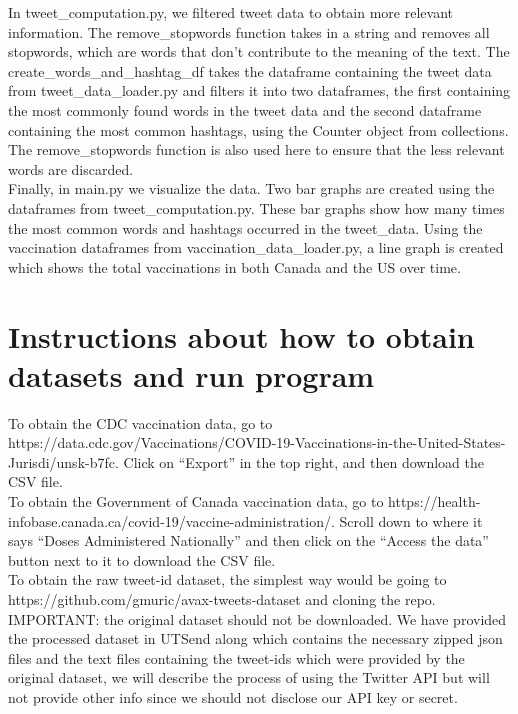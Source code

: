 \documentclass[fontsize=11pt]{article}
\begin{document}
In tweet\_computation.py, we filtered tweet data to obtain more relevant information. The remove\_stopwords function takes in a string and removes all stopwords, which are words that don’t contribute to the meaning of the text. The create\_words\_and\_hashtag\_df takes the dataframe containing the tweet data from tweet\_data\_loader.py and filters it into two dataframes, the first containing the most commonly found words in the tweet data and the second dataframe containing the most common hashtags, using the Counter object from collections. The remove\_stopwords function is also used here to ensure that the less relevant words are discarded.\\

Finally, in main.py we visualize the data. Two bar graphs are created using the dataframes from tweet\_computation.py. These bar graphs show how many times the most common words and hashtags occurred in the tweet\_data. Using the vaccination dataframes from vaccination\_data\_loader.py, a line graph is created which shows the total vaccinations in both Canada and the US over time.

\section*{Instructions about how to obtain datasets and run program}
To obtain the CDC vaccination data, go to https://data.cdc.gov/Vaccinations/COVID-19-Vaccinations-in-the-United-States-Jurisdi/unsk-b7fc. Click on “Export” in the top right, and then download the CSV file. \\

To obtain the Government of Canada vaccination data, go to https://health-infobase.canada.ca/covid-19/vaccine-administration/. Scroll down to where it says “Doses Administered Nationally” and then click on the “Access the data” button next to it to download the CSV file. \\

To obtain the raw tweet-id dataset, the simplest way would be going to https://github.com/gmuric/avax-tweets-dataset and cloning the repo.
IMPORTANT: the original dataset should not be downloaded. We have provided the processed dataset in UTSend along which contains the necessary zipped json files and the text files containing the tweet-ids which were provided by the original dataset, we will describe the process of using the Twitter API but will not provide other info since we should not disclose our API key or secret. \\
\end{document}
